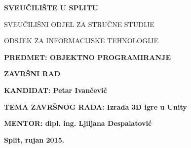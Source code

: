 \begin{center}
\thispagestyle{empty}

\begingroup
    \fontsize{14pt}{12pt}\selectfont\bfseries\center
 	SVEUČILIŠTE U SPLITU \par
	SVEUČILIŠNI ODJEL ZA STRUČNE STUDIJE \par
	ODSJEK ZA INFORMACIJSKE TEHNOLOGIJE
\endgroup\\[4cm]

\end{center}

{ \fontsize{14pt}{12pt}\selectfont\bfseries PREDMET: OBJEKTNO PROGRAMIRANJE}\\[1cm]

\begin{center}
{ \fontsize{16pt}{12pt}\selectfont\bfseries ZAVRŠNI RAD}
\end{center}

{ \fontsize{12pt}{2.5cm}\selectfont\bfseries KANDIDAT: Petar Ivančević}\par
{ \fontsize{12pt}{2.5cm}\selectfont\bfseries TEMA ZAVRŠNOG RADA: Izrada 3D igre u Unity}\par
{ \fontsize{12pt}{2.5cm}\selectfont\bfseries MENTOR: dipl. ing. Ljiljana Despalatović}

\begin{center}
\vfill
{ \fontsize{14pt}{12pt}\selectfont\bfseries Split, rujan 2015.}
\end{center}
